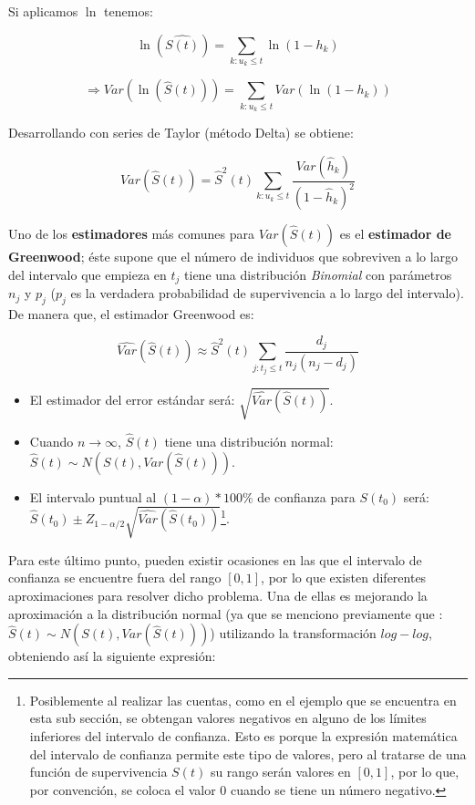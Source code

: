 \documentclass[
  a4paper,
  oneside,
  openany]{book}
\begin{document}
Si aplicamos \(\ln\) tenemos:

\[
\ln(\hat{S(t)}) = \sum_{k:u_k \leq t} \ln(1-h_k)
\]

\[
\Longrightarrow Var(\ln(\hat{S}(t))) = \sum_{k:u_k \leq t} Var(\ln(1-h_k))
\]

Desarrollando con series de Taylor (método Delta) se obtiene:

\[
Var(\hat{S}(t)) = \hat{S}^2(t)\sum_{k:u_k \leq t}\frac{Var(\hat{h}_k)}{(1-\hat{h}_{k})^2}
\]

Uno de los \textbf{estimadores} más comunes para \(Var(\hat{S}(t))\) es el \textbf{estimador de Greenwood}; éste supone que el número de individuos que sobreviven a lo largo del intervalo que empieza en \(t_j\) tiene una distribución \emph{Binomial} con parámetros \(n_j\) y \(p_j\) (\(p_j\) es la verdadera probabilidad de supervivencia a lo largo del intervalo). De manera que, el estimador Greenwood es:

\[
\hat{Var}(\hat{S}(t)) \approx \hat{S}^2(t) \sum_{j:t_{j}\leq t}\frac{d_{j}}{n_{j}(n_{j}-d_{j})}
\]

\begin{itemize}
\item
  El estimador del error estándar será: \(\sqrt{\hat{Var}(\hat{S}(t))}\).
\item
  Cuando \(n\rightarrow\infty\), \(\hat{S}(t)\) tiene una distribución normal: \(\hat{S}(t)\sim N(S(t), Var(\hat{S}(t)))\).
\item
  El intervalo puntual al \((1-\alpha)*100\%\) de confianza para \(S(t_{0})\) será: \(\hat{S}(t_{0}) \pm Z_{1-\alpha/2} \sqrt{\hat{Var}(\hat{S}(t_0))}\)\footnote{Posiblemente al realizar las cuentas, como en el ejemplo que se encuentra en esta sub sección, se obtengan valores negativos en alguno de los límites inferiores del intervalo de confianza. Esto es porque la expresión matemática del intervalo de confianza permite este tipo de valores, pero al tratarse de una función de supervivencia \(S(t)\) su rango serán valores en \([0,1]\), por lo que, por convención, se coloca el valor 0 cuando se tiene un número negativo.}.
\end{itemize}

Para este último punto, pueden existir ocasiones en las que el intervalo de confianza se encuentre fuera del rango \([0,1]\), por lo que existen diferentes aproximaciones para resolver dicho problema. Una de ellas es mejorando la aproximación a la distribución normal (ya que se menciono previamente que : \(\hat{S}(t)\sim N(S(t), Var(\hat{S}(t)))\)) utilizando la transformación \(log-log\), obteniendo así la siguiente expresión:
\end{document}
